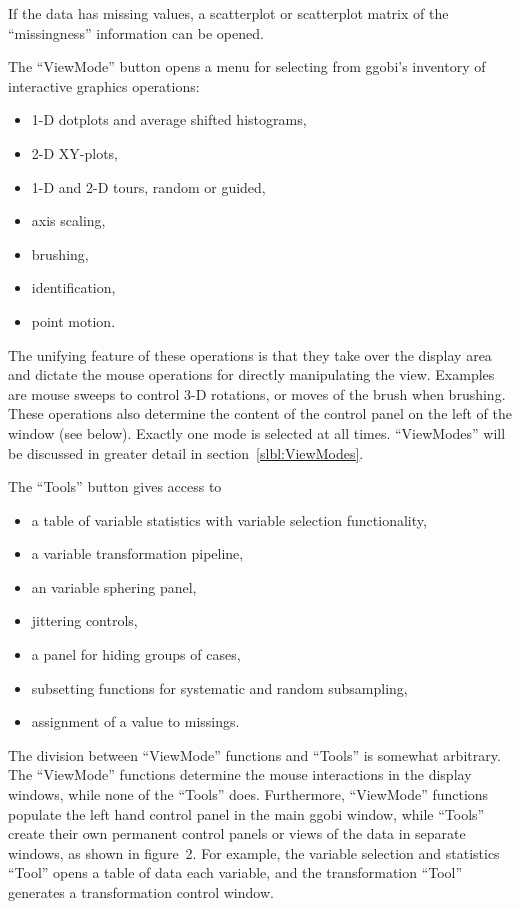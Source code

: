 \documentclass[11pt]{article}
\begin{document}
If the data has missing values, a scatterplot or scatterplot matrix
of the ``missingness'' information can be opened.

The ``ViewMode'' button opens a menu for selecting from ggobi's
inventory of interactive graphics operations: 
\begin{itemize}
\itemsep 0em
\item 1-D dotplots and average shifted histograms,
\item 2-D XY-plots, 
\item 1-D and 2-D tours, random or guided,
\item axis scaling,
\item brushing, 
\item identification, 
\item point motion.  
\end{itemize}

The unifying feature of these operations is that they take over the
display area and dictate the mouse operations for directly
manipulating the view.  Examples are mouse sweeps to control 3-D
rotations, or moves of the brush when brushing.  These operations
also determine the content of the control panel on the left of the
window (see below).  Exactly one mode is selected at all times.
``ViewModes'' will be discussed in greater detail in
section~\ref{slbl:ViewModes}.

The ``Tools'' button gives access to 
\begin{itemize}
\itemsep 0em
\item a table of variable statistics with variable selection functionality,
\item a variable transformation pipeline,
\item an variable sphering panel,
\item jittering controls,
\item a panel for hiding groups of cases,
\item subsetting functions for systematic and random subsampling, 
\item assignment of a value to missings.

\end{itemize}
The division between ``ViewMode'' functions and ``Tools'' is somewhat
arbitrary.  The ``ViewMode'' functions determine the mouse
interactions in the display windows, while none of the ``Tools''
does.  Furthermore, ``ViewMode'' functions populate the left hand
control panel in the main ggobi window, while ``Tools'' create their
own permanent control panels or views of the data in separate
windows, as shown in figure~2.  For example, the variable selection
and statistics ``Tool'' opens a table of data each variable, and the
transformation ``Tool'' generates a transformation control window.
\end{document}
